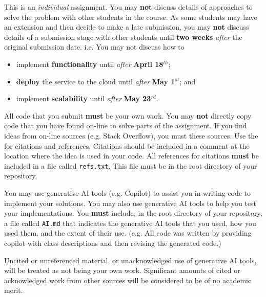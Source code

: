 \documentclass{csse4400}
\begin{document}
This is an \textit{individual} assignment.
You may \textbf{not} discuss details of approaches to solve the problem with other students in the course.
As some students may have an extension and then decide to make a late submission, 
you may \textbf{not} discuss details of a submission stage with other students
until \textbf{two weeks} \textit{after} the original submission date.
i.e. You may not discuss how to
\begin{itemize}
    \item implement \textbf{functionality} until \emph{after} \textbf{April 18$^{th}$};
    \item \textbf{deploy} the service to the cloud until \emph{after} \textbf{May 1$^{st}$}; and
    \item implement \textbf{scalability} until \emph{after} \textbf{May 23$^{rd}$}.
\end{itemize}

All code that you submit \textbf{must} be your own work.
You may \textbf{not} directly copy code that you have found on-line to solve parts of the assignment.
If you find ideas from on-line sources (e.g. Stack Overflow),
you must  these sources.
Use the 
for citations and references.
Citations should be included in a comment at the location where the idea is used in your code.
All references for citations \textbf{must} be included in a file called \texttt{refs.txt}.
This file must be in the root directory of your repository.

You may use generative AI tools (e.g. Copilot) to assist you in writing code to implement your solutions.
You may also use generative AI tools to help you test your implementations.
You \textbf{must} include, in the root directory of your repository,
a file called \texttt{AI.md} that indicates the generative AI tools that you used,
how you used them, and the extent of their use.
(e.g. All code was written by providing copilot with class descriptions and then revising the generated code.)

Uncited or unreferenced material, or unacknowledged use of generative AI tools,
will be treated as not being your own work.
Significant amounts of cited or acknowledged work from other sources
will be considered to be of no academic merit.







\end{document}
